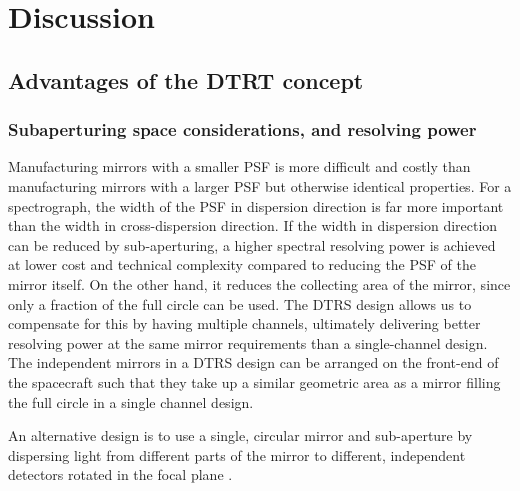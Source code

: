 \documentclass[linenumbers]{aastex631}
\begin{document}
\section{Discussion}
\label{sect:discussion}

\subsection{Advantages of the DTRT concept}
\subsubsection{Subaperturing space considerations, and resolving power}
Manufacturing mirrors with a smaller PSF is more difficult and costly than manufacturing mirrors with a larger PSF but otherwise identical properties. For a spectrograph, the width of the PSF in dispersion direction is far more important than the width in cross-dispersion direction. If the width in dispersion direction can be reduced by sub-aperturing, a higher spectral resolving power is achieved at lower cost and technical complexity compared to reducing the PSF of the mirror itself. On the other hand, it reduces the collecting area of the mirror, since only a fraction of the full circle can be used. The DTRS design allows us to compensate for this by having multiple channels, ultimately delivering better resolving power at the same mirror requirements than a single-channel design. The independent mirrors in a DTRS design can be arranged on the front-end of the spacecraft such that they take up a similar geometric area as a mirror filling the full circle in a single channel design.

An alternative design is to use a single, circular mirror and sub-aperture by dispersing light from different parts of the mirror to different, independent detectors rotated in the focal plane \citep{2019JATIS...5b1003G}.
\end{document}
